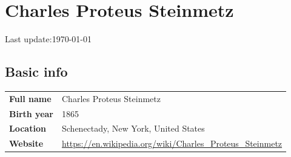 \documentclass[a4paper]{article}
\begin{document}
\section*{Charles Proteus Steinmetz}
\vspace{1em}
Last update:\@ \today{}%
\vspace{1em}
\subsection*{Basic info}
%
\begin{tabularx}{\textwidth}{@{}lX}
     \textbf{Full name}  & Charles Proteus Steinmetz
  \\ \textbf{Birth year} & 1865
  \\ \textbf{Location}   & Schenectady, New York, United States
  \\ \textbf{Website}    & \url{https://en.wikipedia.org/wiki/Charles_Proteus_Steinmetz}
\end{tabularx}
\end{document}
